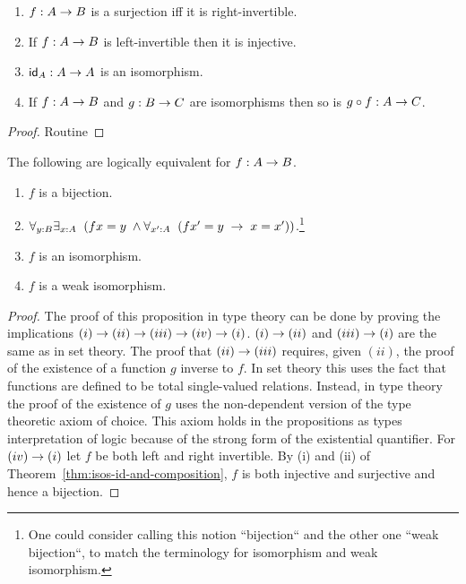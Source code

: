 \begin{thm}\label{thm:isos-id-and-composition} $\;$
\begin{enumerate}
\item $f:A\ra B$ is a surjection iff it is right-invertible.
\item If $f:A\ra B$ is left-invertible then it is injective.
\item $\idfunc[A]:A\ra A$ is an isomorphism.
\item If $f:A\ra B$ and $g:B\ra C$ are isomorphisms then so is $g\circ f:A\ra C$.
\end{enumerate}
\end{thm}
\begin{proof} Routine
\end{proof}
\begin{thm}\label{thm:bijections-isos}
The following are logically equivalent for $f:A\ra B$.
\begin{enumerate}
\item $f$ is a bijection.
\item $\forall_{y:B}\exists_{x:A}\;\; (fx=y\;\wedge \forall_{x':A}\;\; (fx'=y\;\ra\; x=x'))$.\footnote{One could consider calling this notion ``bijection`` and the other one ``weak bijection``, to match the terminology for isomorphism and weak isomorphism.}
\item $f$ is an isomorphism.
\item $f$ is a weak isomorphism.
\end{enumerate}
\end{thm}
\begin{proof}
The proof of this proposition in type theory can be done by proving the implications $(i)\ra (ii)\ra (iii)\ra (iv)\ra (i)$.  $(i)\ra (ii)$ and $(iii)\ra (i)$ are the same as in set theory.  The proof that $(ii)\ra (iii)$ requires, given $(ii)$, the proof of the existence of a function $g$ inverse to $f$.  In set theory this uses the fact that functions are defined to be total single-valued relations.  Instead, in type theory the proof of the existence of $g$
uses the non-dependent version of the type theoretic axiom of choice.  This axiom holds in the propositions as types interpretation of logic because of the strong form of the existential quantifier.  For $(iv)\ra (i)$ let $f$ be both left and right invertible.  By (i) and (ii) of Theorem~\ref{thm:isos-id-and-composition}, $f$ is both injective and surjective and hence a bijection.  
\end{proof}
\newpage

